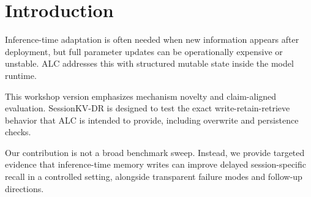 \section{Introduction}
Inference-time adaptation is often needed when new information appears after deployment, but full parameter updates can be operationally expensive or unstable. ALC addresses this with structured mutable state inside the model runtime.

This workshop version emphasizes mechanism novelty and claim-aligned evaluation. SessionKV-DR is designed to test the exact write-retain-retrieve behavior that ALC is intended to provide, including overwrite and persistence checks.

Our contribution is not a broad benchmark sweep. Instead, we provide targeted evidence that inference-time memory writes can improve delayed session-specific recall in a controlled setting, alongside transparent failure modes and follow-up directions.

